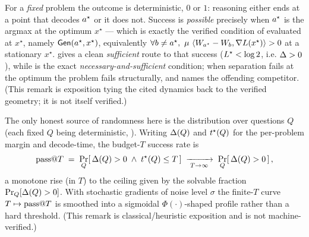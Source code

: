 \begin{remark}
\label{rem:structural}
For a \emph{fixed} problem the outcome is deterministic, $0$ or $1$: reasoning either ends at a
point that decodes $a^{\star}$ or it does not. Success is \emph{possible} precisely when $a^{\star}$
is the argmax at the optimum $x^{\star}$ --- which is exactly the verified condition of
 evaluated at $x^{\star}$, namely $\mathsf{Gen}(a^{\star}, x^{\star})$, equivalently
$\forall b \ne \astar,\ \mu\,\inner{W_{\astar} - W_b}{\grad\loss(x^{\star})} > 0$ at a stationary
$x^{\star}$.  gives a clean \emph{sufficient} route to that
success ($L^{\star} < \log 2$, i.e. $\Delta > 0$), while  is the exact
\emph{necessary-and-sufficient} condition; when separation fails at the optimum the problem
fails structurally, and  names the offending competitor. (This remark is
exposition tying the cited dynamics back to the verified geometry; it is not itself verified.)
\end{remark}

\begin{remark}
\label{rem:probability}
The only honest source of randomness here is the distribution over questions $Q$ (each fixed
$Q$ being deterministic, ). Writing $\Delta(Q)$ and $t^{\star}(Q)$ for the
per-problem margin and decode-time, the budget-$T$ success rate is
\begin{align*}
\mathrm{pass}@T \;=\; \Pr_Q\!\left[\, \Delta(Q) > 0 \;\wedge\; t^{\star}(Q) \le T \,\right]
\;\xrightarrow[\;T \to \infty\;]{}\; \Pr_Q\!\left[\, \Delta(Q) > 0 \,\right],
\end{align*}
a monotone rise (in $T$) to the ceiling given by the solvable fraction
$\Pr_Q[\Delta(Q) > 0]$. With stochastic gradients of noise level $\sigma$ the finite-$T$ curve
$T \mapsto \mathrm{pass}@T$ is smoothed into a sigmoidal $\Phi(\cdot)$-shaped profile rather than a
hard threshold. (This remark is classical/heuristic exposition and is not machine-verified.)
\end{remark}
